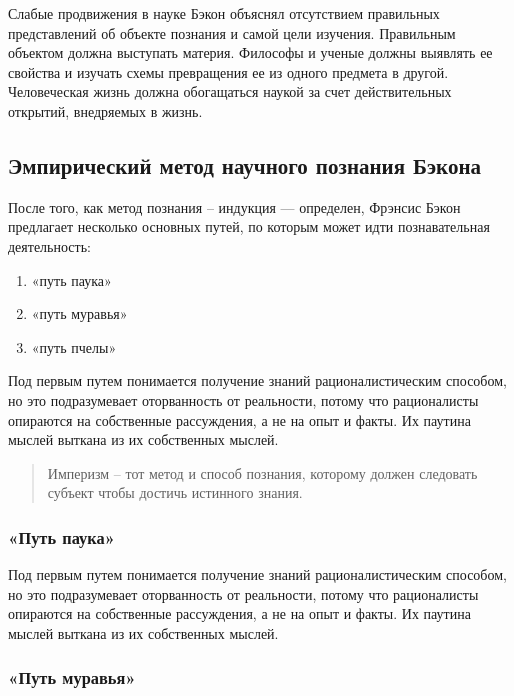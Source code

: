 \documentclass[a4paper, 14pt]{extreport}
\begin{document}
Слабые продвижения в науке Бэкон объяснял отсутствием правильных
представлений об объекте познания и самой цели изучения. Правильным
объектом должна выступать материя. Философы и ученые должны выявлять ее
свойства и изучать схемы превращения ее из одного предмета в другой.
Человеческая жизнь должна обогащаться наукой за счет действительных
открытий, внедряемых в жизнь.

\subsection{Эмпирический метод научного познания Бэкона}

После того, как метод познания -- индукция --- определен, Фрэнсис Бэкон
предлагает несколько основных путей, по которым может идти
познавательная деятельность:

\begin{enumerate}
\def\labelenumi{\arabic{enumi}.}

\item
  «путь паука»
\item
  «путь муравья»
\item
  «путь пчелы»
\end{enumerate}

Под первым путем понимается получение знаний рационалистическим
способом, но это подразумевает оторванность от реальности, потому что
рационалисты опираются на собственные рассуждения, а не на опыт и факты.
Их паутина мыслей выткана из их собственных мыслей.

\begin{quote}
Империзм -- тот метод и способ познания, которому должен следовать
субъект чтобы достичь истинного знания.
\end{quote}

\subsubsection{«Путь паука»}

Под первым путем понимается получение знаний рационалистическим
способом, но это подразумевает оторванность от реальности, потому что
рационалисты опираются на собственные рассуждения, а не на опыт и факты.
Их паутина мыслей выткана из их собственных мыслей.

\subsubsection{«Путь муравья»}
\end{document}
